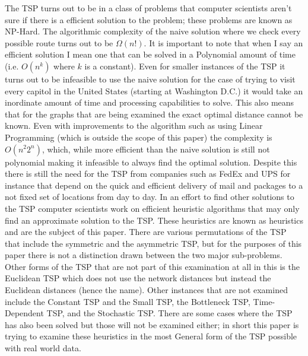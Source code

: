 \documentclass[midd]{thesis}
\newcommand{\tab}{\hspace*{2em}}
\begin{document}
\tab The TSP turns out to be in a class of problems that computer scientists aren't sure if there is a efficient solution to the problem; these problems are known as NP-Hard. The algorithmic complexity of the naive solution where we check every possible route turns out to be $\Omega(n!)$. It is important to note that when I say an efficient solution I mean one that can be solved in a Polynomial amount of time (i.e. $O(n^k)$ where $k$ is a constant). Even for smaller instances of the TSP it turns out to be infeasible to use the naive solution for the case of trying to visit every capitol in the United States (starting at Washington D.C.) it would take an inordinate amount of time and processing capabilities to solve. This also means that for the graphs that are being examined the exact optimal distance cannot be known. Even with improvements to the algorithm such as using Linear Programming (which is outside the scope of this paper) the complexity is $O(n^{2}2^{n})$, which, while more efficient than the naive solution is still not polynomial making it  infeasible to always find the optimal solution. Despite this there is still the need for the TSP from companies such as FedEx and UPS for instance that depend on the quick and efficient delivery of mail and packages to a not fixed set of locations from day to day. In an effort to find other solutions to the TSP computer scientists work on efficient heuristic algorithms that may only find an approximate solution to the TSP. These heuristics are known as heuristics and are the subject of this paper. There are various permutations of the TSP that include the symmetric and the asymmetric TSP, but for the purposes of this paper there is not a distinction drawn between the two major sub-problems. Other forms of the TSP that are not part of this examination at all in this is the Euclidean TSP which does not use the network distances but instead the Euclidean distances (hence the name). Other instances that are not examined include the Constant TSP and the Small TSP, the Bottleneck TSP, Time-Dependent TSP, and the Stochastic TSP. There are some cases where the TSP has also been solved but those will not be examined either; in short this paper is trying to examine these heuristics in the most General form of the TSP possible with real world data.\\
\end{document}
